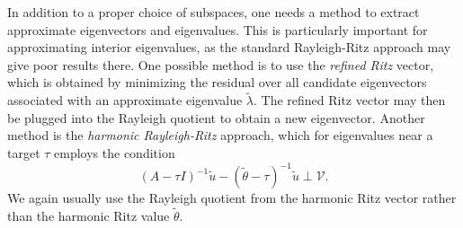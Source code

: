 \documentclass[12pt, leqno]{article} %
\begin{document}
In addition to a proper choice of subspaces, one needs a method to
extract approximate eigenvectors and eigenvalues.  This is particularly
important for approximating interior eigenvalues, as the standard
Rayleigh-Ritz approach may give poor results there.  One possible
method is to use the {\em refined Ritz} vector, which is obtained by
minimizing the residual over all candidate eigenvectors associated
with an approximate eigenvalue $\tilde{\lambda}$.  The refined Ritz
vector may then be plugged into the Rayleigh quotient to obtain a
new eigenvector.  Another method is the {\em harmonic Rayleigh-Ritz}
approach, which for eigenvalues near a target $\tau$ employs the
condition
\[
  (A-\tau I)^{-1} \tilde{u} - (\tilde{\theta}-\tau)^{-1} \tilde{u} \perp \mathcal{V}.
\]
We again usually use the Rayleigh quotient from the harmonic Ritz vector
rather than the harmonic Ritz value $\tilde{\theta}$.
\end{document}

